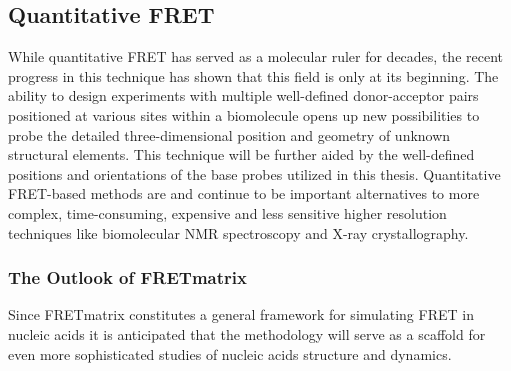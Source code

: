 \subsection{Quantitative FRET}
 While quantitative FRET has served as a molecular ruler for decades, the recent progress in this technique has shown that this field is only at its beginning. The ability to design experiments with multiple well-defined donor-acceptor pairs positioned at various sites within a biomolecule opens up new possibilities to probe the detailed three-dimensional position and geometry of unknown structural elements. This technique will be further aided by the well-defined positions and orientations of the base probes utilized in this thesis. Quantitative FRET-based methods are and continue to be important alternatives to more complex, time-consuming, expensive and less sensitive higher resolution techniques like biomolecular NMR spectroscopy and X-ray crystallography.

\subsubsection{The Outlook of FRETmatrix}
 Since FRETmatrix constitutes a general framework for simulating FRET in nucleic acids it is anticipated that the methodology will serve as a scaffold for even more sophisticated studies of nucleic acids structure and dynamics.

